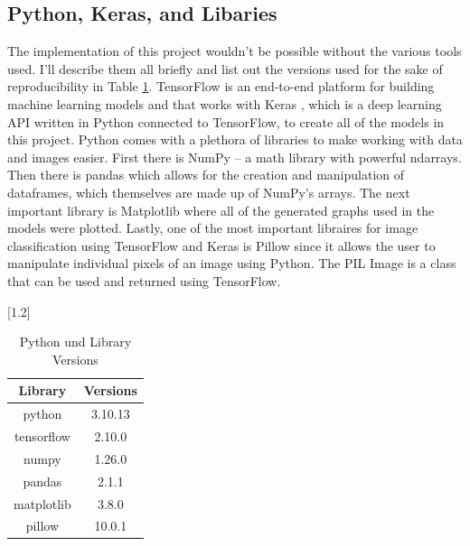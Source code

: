 \documentclass[12pt]{article}
\begin{document}
        \subsection{Python, Keras, and Libaries}
                
            The implementation of this project wouldn’t be possible without the various tools used. 
            I’ll describe them all briefly and list out the versions used for the sake of reproducibility in Table \ref{py-versions}. 
            TensorFlow \cite{abadi2016-tensorflow} is an end-to-end platform for building machine learning models 
            and that works with Keras \cite{chollet2015-keras}, which is a deep learning API written in Python connected to TensorFlow, 
            to create all of the models in this project. 
            Python comes with a plethora of libraries to make working with data and images easier. 
            First there is NumPy \cite{harris2020-numpy} -- a math library with powerful ndarrays. 
            Then there is pandas \cite{reback2020-pandas} \cite{mckinney2010-pandas} 
            which allows for the creation and manipulation of dataframes, which themselves are made up of NumPy’s arrays. 
            The next important library is Matplotlib \cite{hunter2007-matplotlib} 
            where all of the generated graphs used in the models were plotted. 
            Lastly, one of the most important libraires for image classification using TensorFlow 
            and Keras is Pillow \cite{clark2015pillow} since it allows the user to manipulate individual pixels of an image using Python. 
            The PIL Image is a class that can be used and returned using TensorFlow.
                
            \begin{table}[htp]

                \begin{center} 

                \scalebox{1.2}[1.2]{
                \begin{tabular}{ | c | c | }
                \hline
                \textbf{Library}    &       \textbf{Versions} \\
                \hline
                python              &       3.10.13 \\ 
                tensorflow          &       2.10.0 \\
                numpy               &       1.26.0 \\
                pandas              &       2.1.1 \\
                matplotlib          &       3.8.0 \\
                pillow              &       10.0.1 \\
                
                \hline
                \end{tabular}
                }

                \caption{Python und Library Versions}
                \label{py-versions}

                \end{center}

            \end{table}
       
\end{document}
